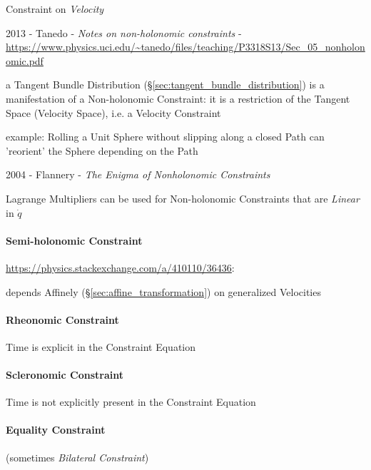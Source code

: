 Constraint on \emph{Velocity}

2013 - Tanedo - \emph{Notes on non-holonomic constraints} -
\url{https://www.physics.uci.edu/~tanedo/files/teaching/P3318S13/Sec_05_nonholonomic.pdf}

a Tangent Bundle Distribution (\S\ref{sec:tangent_bundle_distribution}) is a
manifestation of a Non-holonomic Constraint: it is a restriction of the Tangent
Space (Velocity Space), i.e. a Velocity Constraint

example: Rolling a Unit Sphere without slipping along a closed Path can
'reorient' the Sphere depending on the Path

2004 - Flannery - \emph{The Enigma of Nonholonomic Constraints}

Lagrange Multipliers can be used for Non-holonomic Constraints that are
\emph{Linear} in $\dot{q}$



\paragraph{Semi-holonomic Constraint}\label{sec:semiholonomic_constraint}\hfill

\url{https://physics.stackexchange.com/a/410110/36436}:

depends Affinely (\S\ref{sec:affine_transformation}) on generalized Velocities



\paragraph{Rheonomic Constraint}\label{sec:rheonomic_constraint}\hfill

Time is explicit in the Constraint Equation



\paragraph{Scleronomic Constraint}\label{sec:scleronomic_constraint}\hfill

Time is not explicitly present in the Constraint Equation



\paragraph{Equality Constraint}\label{sec:equality_constraint}\hfill

(sometimes \emph{Bilateral Constraint})



